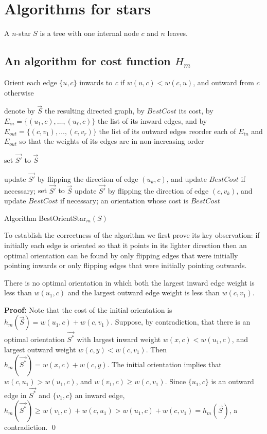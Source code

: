  \section{Algorithms for stars}\label{s.1}
 A $n$-star $S$ is a tree with one internal node $c$ and $n$ leaves.

 \subsection{An algorithm for cost function $H_m$}
 \begin{algorithm}
 	
Orient each edge $\{u,c\}$ inwards to \textit{c} if $w(u,c)<w(c,u)$,
and outward from $c$ otherwise\; \label{i0}
 	 
denote by $\vec{S}$ the resulting directed graph, by $BestCost$ its cost, 
by $E_{in}=\{(u_1,c),\ldots, (u_{\ell},c)\}$ the list of its inward edges, 
and by $E_{out}=\{(c,v_1),\ldots, (c,v_r)\}$ the list of its outward edges\;
\label{i00} reorder each of $E_{in}$ and $E_{out}$ so that
the weights of its edges are in non-increasing order\;

set $\vec{S'}$ to $\vec{S}$\;

  {update $\vec{S'}$ by flipping the direction of edge $(u_k,c)$, and update $BestCost$ if necessary;}
   \label{i1} 
set $\vec{S'}$ to $\vec{S}$\;
   {update $\vec{S'}$ by flipping the direction of edge $(c,v_k)$, and update $BestCost$ if necessary;}
  \label{i2}
 	\Return an orientation whose cost is $BestCost$\;
 	\caption{Algorithm BestOrientStar$_m (S)$}
 	\label{algo:oc-s}
 \end{algorithm}

\bigskip

To establish the correctness of the algorithm we first prove its key observation:  
if initially  each edge is oriented
so that it points in its lighter direction then an optimal orientation can be
found by only flipping edges that were initially pointing inwards or only
flipping edges that were initially pointing outwards. 
\begin{lemma}\label{l.best}
	There is no optimal orientation in which both the largest inward edge weight is less than $w(u_1,c)$ 
	and the largest outward edge weight is less than $w(c,v_1)$.
\end{lemma}

\noindent \textbf{Proof:}
Note that the cost of the initial orientation is $h_m(\vec{S})=w(u_1,c)+w(c,v_1)$.
Suppose, by contradiction, that there is an optimal orientation $\vec{S^*}$ 
with largest inward weight $w(x,c)< w(u_1,c)$,
and largest outward weight $w(c,y)<w(c,v_1)$.
Then $h_m(\vec{S^*})=w(x,c)+w(c,y)$.
The initial orientation implies that $w(c,u_1) > w(u_1,c)$, and $w(v_1,c) \geq w(c,v_1)$.
Since $\{u_1,c\}$ is an outward edge in $\vec{S^*}$ and $\{v_1,c\}$ an inward edge,
$h_m(\vec{S^*})\geq  
w(v_1,c)+w(c,u_1) >  w(u_1,c)+w(c,v_1) =h_m(\vec{S})$, a contradiction.
\qed

